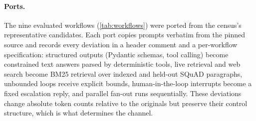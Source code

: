 \paragraph{Ports.} The nine evaluated workflows (\cref{tab:workflows}) were ported from the census's representative candidates. Each port copies prompts verbatim from the pinned source and records every deviation in a header comment and a per-workflow specification: structured outputs (Pydantic schemas, tool calling) become constrained text answers parsed by deterministic tools, live retrieval and web search become BM25 retrieval over indexed and held-out SQuAD paragraphs, unbounded loops receive explicit bounds, human-in-the-loop interrupts become a fixed escalation reply, and parallel fan-out runs sequentially. These deviations change absolute token counts relative to the originals but preserve their control structure, which is what determines the channel.
